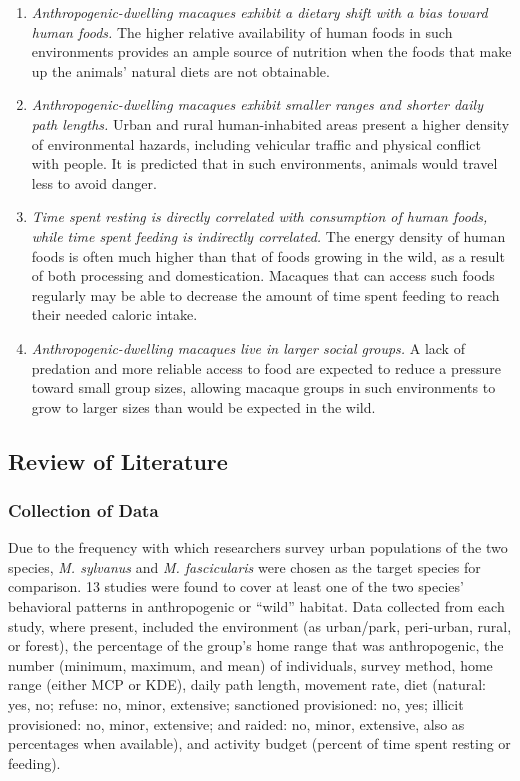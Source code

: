 \documentclass[american]{../../../coursework}
\begin{document}
\begin{enumerate}

    \item \emph{Anthropogenic-dwelling macaques exhibit a dietary shift with a
    bias toward human foods.} The higher relative availability of human foods
    in such environments provides an ample source of nutrition when the foods
    that make up the animals' natural diets are not obtainable.
    
    \item \emph{Anthropogenic-dwelling macaques exhibit smaller ranges and
    shorter daily path lengths.} Urban and rural human-inhabited areas present
    a higher density of environmental hazards, including vehicular traffic and
    physical conflict with people. It is predicted that in such environments,
    animals would travel less to avoid danger.
    
    \item \emph{Time spent resting is directly correlated with consumption of
    human foods, while time spent feeding is indirectly correlated.} The
    energy density of human foods is often much higher than that of foods
    growing in the wild, as a result of both processing and domestication.
    Macaques that can access such foods regularly may be able to decrease the
    amount of time spent feeding to reach their needed caloric intake.
    
    \item \emph{Anthropogenic-dwelling macaques live in larger social groups.}
    A lack of predation and more reliable access to food are expected to
    reduce a pressure toward small group sizes, allowing macaque groups in
    such environments to grow to larger sizes than would be expected in the
    wild.
    
\end{enumerate}
    
\subsection{Review of Literature}

\subsubsection{Collection of Data}

Due to the frequency with which researchers survey urban populations of the
two species, \textit{M. sylvanus} and \textit{M. fascicularis} were chosen as
the target species for comparison. 13 studies were found to cover at least one
of the two species' behavioral patterns in anthropogenic or ``wild'' habitat.
Data collected from each study, where present, included the environment
(as urban/park, peri-urban, rural, or forest), the percentage of the group's
home range that was anthropogenic, the number (minimum, maximum, and mean) of
individuals, survey method, home range (either MCP or KDE), daily path length,
movement rate, diet (natural: yes, no; refuse: no, minor, extensive;
sanctioned provisioned: no, yes; illicit provisioned: no, minor, extensive;
and raided: no, minor, extensive, also as percentages when available), and
activity budget (percent of time spent resting or feeding).
\end{document}
